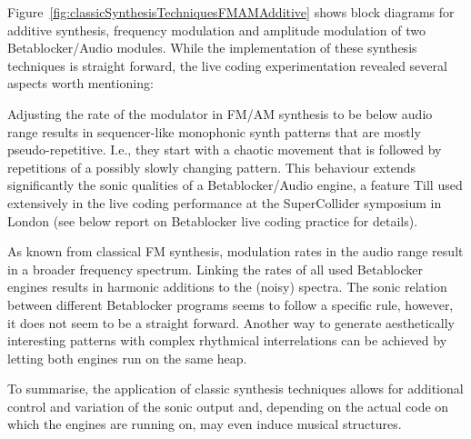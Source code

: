\documentclass[letterpaper, 12pt]{article}
\begin{document}
Figure~\ref{fig:classicSynthesisTechniquesFMAMAdditive} shows block diagrams for additive synthesis, frequency modulation and amplitude modulation of two Betablocker/Audio modules.
While the implementation of these synthesis techniques is straight forward, the live coding experimentation revealed several aspects worth mentioning:

Adjusting the rate of the modulator in FM/AM synthesis to be below audio range results in sequencer-like monophonic synth patterns that are mostly pseudo-repetitive.
I.e., they start with a chaotic movement that is followed by repetitions of a possibly slowly changing pattern.
This behaviour extends significantly the sonic qualities of a Betablocker/Audio engine, a feature Till used extensively in the live coding performance at the SuperCollider symposium in London (see below report on Betablocker live coding practice for details).

As known from classical FM synthesis, modulation rates in the audio range result in a broader frequency spectrum.
Linking the rates of all used Betablocker engines results in harmonic additions to the (noisy) spectra.
The sonic relation between different Betablocker programs seems to follow a specific rule, however, it does not seem to be a straight forward.
Another way to generate aesthetically interesting patterns with complex rhythmical interrelations can be achieved by letting both engines run on the same heap.

To summarise, the application of classic synthesis techniques allows for additional control and variation of the sonic output and, depending on the actual code on which the engines are running on, may even induce musical structures.
\end{document}
